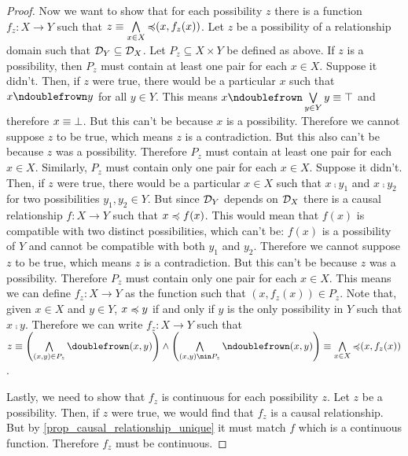 \documentclass[11pt,letterpaper,fleqn]{memoir} %
\begin{document}
\begin{mathSection}
\begin{proof}
	Now we want to show that for each possibility $z$ there is a function $f_z : X \to Y$ such that $z\equiv\bigwedge\limits_{x\in X} \mathbin{\preccurlyeq}(x, f_z(x))$. Let $z$ be a possibility of a relationship domain such that $\mathcal{D}_Y \subseteq \mathcal{D}_X$. Let $P_z \subseteq X \times Y$ be defined as above. If $z$ is a possibility, then $P_z$ must contain at least one pair for each $x \in X$. Suppose it didn't. Then, if $z$ were true, there would be a particular $x$ such that $x \ncomp y$ for all $y \in Y$. This means $x \ncomp \bigOR\limits_{y \in Y} y \equiv \tautology$ and therefore $x \equiv \bot$. But this can't be because $x$ is a possibility. Therefore we cannot suppose $z$ to be true, which means $z$ is a contradiction. But this also can't be because $z$ was a possibility. Therefore $P_z$ must contain at least one pair for each $x \in X$. Similarly, $P_z$ must contain only one pair for each $x \in X$. Suppose it didn't. Then, if $z$ were true, there would be a particular $x \in X$ such that $x \comp y_1$ and $x \comp y_2$ for two possibilities $y_1, y_2 \in Y$. But since $\mathcal{D}_Y$ depends on $\mathcal{D}_X$ there is a causal relationship $f : X \to Y$ such that $x \preccurlyeq f(x)$. This would mean that $f(x)$ is compatible with two distinct possibilities, which can't be: $f(x)$ is a possibility of $Y$ and cannot be compatible with both $y_1$ and $y_2$. Therefore we cannot suppose $z$ to be true, which means $z$ is a contradiction. But this can't be because $z$ was a possibility. Therefore $P_z$ must contain only one pair for each $x \in X$. This means we can define $f_z : X \to Y$ as the function such that $(x, f_z(x)) \in P_z$. Note that, given $x \in X$ and  $y \in Y$, $x \preccurlyeq y$ if and only if $y$ is the only possibility in $Y$ such that $x \comp y$. Therefore we can write $f_z : X \to Y$ such that $z\equiv \left( \bigAND\limits_{(x,y) \in P_z} \mathbin{\comp}(x, y) \right) \AND \left( \bigAND\limits_{(x,y) \nin P_z} \mathbin{\ncomp}(x, y) \right)\equiv\bigAND\limits_{x\in X} \mathbin{\narrower}(x, f_z(x))$.
	
	Lastly, we need to show that $f_z$ is continuous for each possibility $z$. Let $z$ be a possibility. Then, if $z$ were true, we would find that $f_z$ is a causal relationship. But by \ref{prop_causal_relationship_unique} it must match  $f$ which is a continuous function. Therefore $f_z$ must be continuous.
	
\end{proof}
\end{mathSection}
\end{document}
